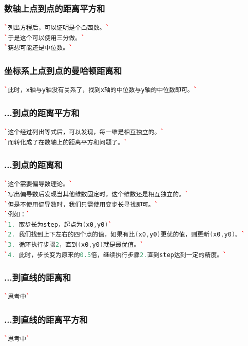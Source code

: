 \documentclass[a4paper]{article}
\begin{document}
\begin{CJK*}{UTF8}{gbsn}
\begin{multicols}{3}
\begin{flushleft}
\subsubsection{数轴上点到点的距离平方和}
\begin{lstlisting}[language={c++}]
`列出方程后，可以证明是个凸函数。`
`于是这个可以使用三分做。`
`猜想可能还是中位数。`
\end{lstlisting}

\subsubsection{坐标系上点到点的曼哈顿距离和}
\begin{lstlisting}[language={c++}]
`此时，x轴与y轴没有关系了，找到x轴的中位数与y轴的中位数即可。`
\end{lstlisting}

\subsubsection{...到点的距离平方和}
\begin{lstlisting}[language={c++}]
`这个经过列出等式后，可以发现，每一维是相互独立的。`
`而转化成了在数轴上的距离平方和问题了。`
\end{lstlisting}

\subsubsection{...到点的距离和}
\begin{lstlisting}[language={c++}]
`这个需要偏导数理论。`
`写出偏导数后发现当其他维数固定时，这个维数还是相互独立的。`
`但是不使用偏导数时，我们只需使用变步长寻找即可。`
`例如：`
`1. 取步长为step，起点为(x0,y0)`
`2. 我们找到上下左右的四个点的值，如果有比(x0,y0)更优的值，则更新(x0,y0)。`
`3. 循环执行步骤2，直到(x0,y0)就是最优值。`
`4. 此时，步长变为原来的0.5倍，继续执行步骤2.直到step达到一定的精度。`
\end{lstlisting}

\subsubsection{...到直线的距离和}
\begin{lstlisting}[language={c++}]
`思考中`
\end{lstlisting}


\subsubsection{...到直线的距离平方和}
\begin{lstlisting}[language={c++}]
`思考中`
\end{lstlisting}




\end{flushleft}
\end{multicols}
\end{CJK*}
\end{document}
